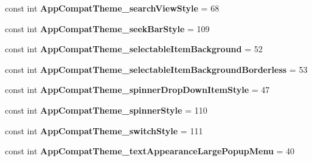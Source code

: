 \begin{DoxyCompactItemize}
\item 
\mbox{\label{class_pinned_app_1_1_droid_1_1_resource_1_1_styleable_adaeeef7aa814f7220edce1ae82936177}} 
const int {\bfseries App\+Compat\+Theme\+\_\+search\+View\+Style} = 68
\item 
\mbox{\label{class_pinned_app_1_1_droid_1_1_resource_1_1_styleable_a07b7103d2268217bdcbc9f5e186766d8}} 
const int {\bfseries App\+Compat\+Theme\+\_\+seek\+Bar\+Style} = 109
\item 
\mbox{\label{class_pinned_app_1_1_droid_1_1_resource_1_1_styleable_a8287aaa66b2e5f52e7732f840198b77f}} 
const int {\bfseries App\+Compat\+Theme\+\_\+selectable\+Item\+Background} = 52
\item 
\mbox{\label{class_pinned_app_1_1_droid_1_1_resource_1_1_styleable_a8a4b0a6b0e53e513a46cd2356f8af554}} 
const int {\bfseries App\+Compat\+Theme\+\_\+selectable\+Item\+Background\+Borderless} = 53
\item 
\mbox{\label{class_pinned_app_1_1_droid_1_1_resource_1_1_styleable_a08e0538c98271fe47b36bd99aa32682e}} 
const int {\bfseries App\+Compat\+Theme\+\_\+spinner\+Drop\+Down\+Item\+Style} = 47
\item 
\mbox{\label{class_pinned_app_1_1_droid_1_1_resource_1_1_styleable_a8bfe19a656e1c1e5a209173c1b6244f3}} 
const int {\bfseries App\+Compat\+Theme\+\_\+spinner\+Style} = 110
\item 
\mbox{\label{class_pinned_app_1_1_droid_1_1_resource_1_1_styleable_a0cd5569f3f70914aca1553f284eb979e}} 
const int {\bfseries App\+Compat\+Theme\+\_\+switch\+Style} = 111
\item 
\mbox{\label{class_pinned_app_1_1_droid_1_1_resource_1_1_styleable_af80fbc92205b8c7710a797b90c36b6f8}} 
const int {\bfseries App\+Compat\+Theme\+\_\+text\+Appearance\+Large\+Popup\+Menu} = 40

\end{DoxyCompactItemize}
